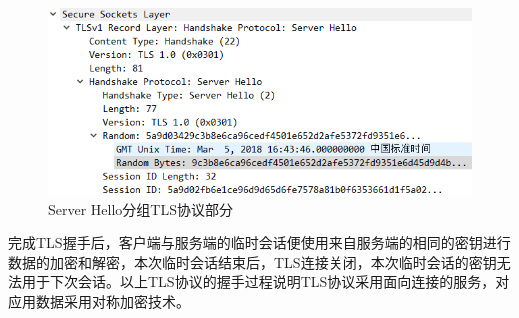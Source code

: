 \begin{figure}
	\centering
	\includegraphics[width=12cm]{image/TLS-Handshake-3}
	\caption{Server Hello分组TLS协议部分}
	\label{fig11}
\end{figure}
\qquad
完成TLS握手后，客户端与服务端的临时会话便使用来自服务端的相同的密钥进行数据的加密和解密，本次临时会话结束后，TLS连接关闭，本次临时会话的密钥无法用于下次会话。以上TLS协议的握手过程说明TLS协议采用面向连接的服务，对应用数据采用对称加密技术。